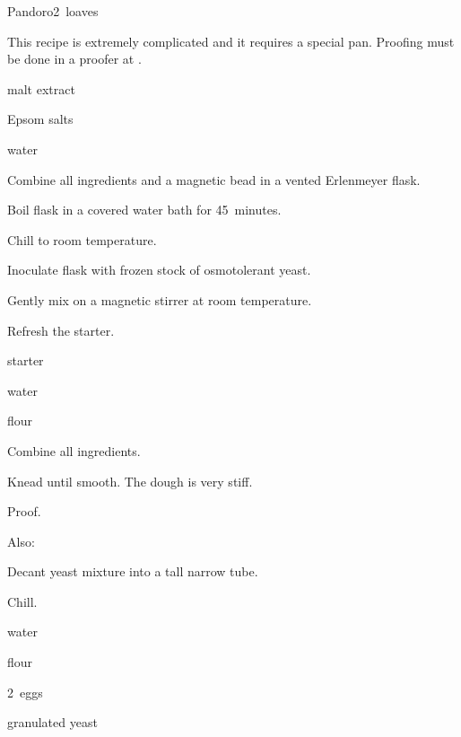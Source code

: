 \begin{recipe}{Pandoro}{}{2~loaves}

This recipe is extremely complicated and it requires a special pan. Proofing must be done in a proofer at .

\begin{ingredients}
\item {} malt extract
\item {} Epsom salts
\item {} water
\end{ingredients}

\begin{directions}
\item Combine all ingredients and a magnetic bead in a vented  Erlenmeyer flask.
\item Boil flask in a covered water bath for 45~minutes.
\item Chill to room temperature.
\item Inoculate flask with frozen stock of osmotolerant yeast.
\item Gently mix on a magnetic stirrer at room temperature.
\end{directions}

Refresh the starter.

\begin{ingredients}
\item {} starter
\item {} water
\item {} flour
\end{ingredients}

\begin{directions}
\item Combine all ingredients.
\item Knead until smooth. The dough is very stiff.
\item Proof.
\end{directions}

Also:

\begin{directions}
\item Decant yeast mixture into a tall narrow tube.
\item Chill.
\end{directions}

\begin{ingredients}
\item {} water
\item {} flour
\item 2~eggs
\item {} granulated yeast
\end{ingredients}


\end{recipe}
